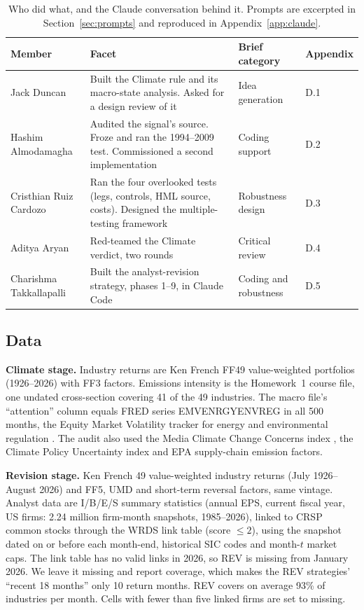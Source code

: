 \documentclass[11pt]{article}
\begin{document}
\begin{table}[h]
\centering\footnotesize
\caption{Who did what, and the Claude conversation behind it. Prompts are excerpted in Section~\ref{sec:prompts} and reproduced in Appendix~\ref{app:claude}.}
\label{tab:members}
\begin{tabularx}{\linewidth}{@{}l Y l l@{}}
\toprule
Member & Facet & Brief category & Appendix \\
\midrule
Jack Duncan & Built the Climate rule and its macro-state analysis. Asked for a design review of it & Idea generation & D.1 \\
Hashim Almodamagha & Audited the signal's source. Froze and ran the 1994--2009 test. Commissioned a second implementation & Coding support & D.2 \\
Cristhian Ruiz Cardozo & Ran the four overlooked tests (legs, controls, HML source, costs). Designed the multiple-testing framework & Robustness design & D.3 \\
Aditya Aryan & Red-teamed the Climate verdict, two rounds & Critical review & D.4 \\
Charishma Takkallapalli & Built the analyst-revision strategy, phases 1--9, in Claude Code & Coding and robustness & D.5 \\
\bottomrule
\end{tabularx}
\end{table}

\subsection{Data}
\label{sec:data}

\textbf{Climate stage.} Industry returns are Ken French FF49 value-weighted portfolios (1926--2026) with FF3 factors. Emissions intensity is the Homework~1 course file, one undated cross-section covering 41 of the 49 industries. The macro file's ``attention'' column equals FRED series EMVENRGYENVREG in all 500 months, the Equity Market Volatility tracker for energy and environmental regulation \citep{emv}. The audit also used the Media Climate Change Concerns index \citep{ardia}, the Climate Policy Uncertainty index \citep{cpu} and EPA supply-chain emission factors.

\textbf{Revision stage.} Ken French 49 value-weighted industry returns (July 1926--August 2026) and FF5, UMD and short-term reversal factors, same vintage. Analyst data are I/B/E/S summary statistics (annual EPS, current fiscal year, US firms: 2.24 million firm-month snapshots, 1985--2026), linked to CRSP common stocks through the WRDS link table (score $\leq 2$), using the snapshot dated on or before each month-end, historical SIC codes and month-$t$ market caps. The link table has no valid links in 2026, so REV is missing from January 2026. We leave it missing and report coverage, which makes the REV strategies' ``recent 18 months'' only 10 return months. REV covers on average 93\% of industries per month. Cells with fewer than five linked firms are set to missing.
\end{document}
